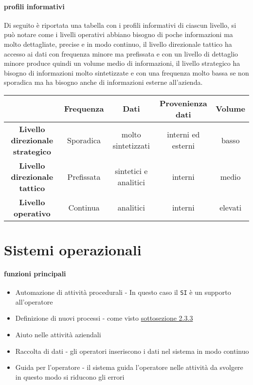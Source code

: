         \paragraph{profili informativi} Di seguito è riportata una tabella con i profili informativi di ciascun livello, si può notare come i livelli operativi abbiano bisogno di poche informazioni ma molto dettagliate, precise e in modo continuo, il livello direzionale tattico ha accesso ai dati con frequenza minore ma prefissata e con un livello di dettaglio minore produce quindi un volume medio di informazioni, il livello strategico ha bisogno di informazioni molto sintetizzate e con una frequenza molto bassa se non sporadica ma ha bisogno anche di informazioni esterne all'azienda.
        \begin{table}[H]
            \begin{adjustbox}{width=\textwidth}
                \begin{tabular}{|c|c|c|c|c|}
                    \hline
                    & \textbf{Frequenza} & \textbf{Dati} & \textbf{Provenienza dati} & \textbf{Volume} \\
                    \hline
                    \textbf{Livello direzionale strategico} & Sporadica & molto sintetizzati & interni ed esterni & basso \\
                    \hline
                    \textbf{Livello direzionale tattico} & Prefissata & sintetici e analitici & interni & medio \\
                    \hline
                    \textbf{Livello operativo} & Continua & analitici & interni & elevati \\
                    \hline
                \end{tabular}
            \end{adjustbox}
        \end{table}
\section{Sistemi operazionali}
    \paragraph{funzioni principali}
        \begin{itemize}
            \item Automazione di attività procedurali - In questo caso il \texttt{SI} è un supporto all'operatore
            \item Definizione di nuovi processi - come visto \hyperref[subsec:nuoviProcessi]{sottosezione 2.3.3}
            \item Aiuto nelle attività aziendali 
            \item Raccolta di dati - gli operatori inseriscono i dati nel sistema in modo continuo
            \item Guida per l'operatore - il sistema guida l'operatore nelle attività da svolgere in questo modo si riducono gli errori
        \end{itemize}
